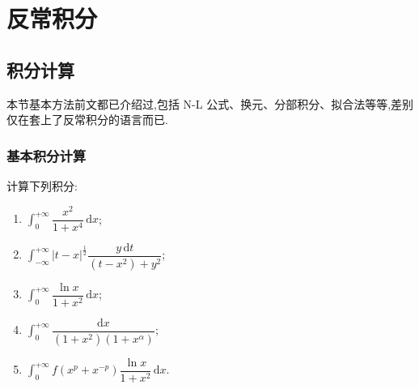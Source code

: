 \setcounter{chapter}{6}
\pagestyle{fancy}

\chapter{反常积分}


\section{积分计算}

本节基本方法前文都已介绍过,包括 N-L 公式、换元、分部积分、拟合法等等,差别仅在套上了反常积分的语言而已.



\subsection{基本积分计算}

\begin{example}
  计算下列积分:
  \begin{enumerate}
    \item $\displaystyle\int_0^{+\infty}\dfrac{x^2}{1+x^4}\,\mathrm{d}x$;
    \item $\displaystyle\int_{-\infty}^{+\infty}|t-x|^{\frac{1}{2}}
            \dfrac{y\,\mathrm{d}t}{(t-x^2)+y^2}$;
    \item $\displaystyle\int_0^{+\infty}\dfrac{\ln x}{1+x^2}\,\mathrm{d}x$;
    \item $\displaystyle\int_0^{+\infty}\dfrac{\mathrm{d}x}{(1+x^2)(1+x^\alpha)}$;
    \item $\displaystyle\int_0^{+\infty}f(x^p+x^{-p})\dfrac{\ln x}{1+x^2}\,\mathrm{d}x$.
  \end{enumerate}
\end{example}
\exampleblank

